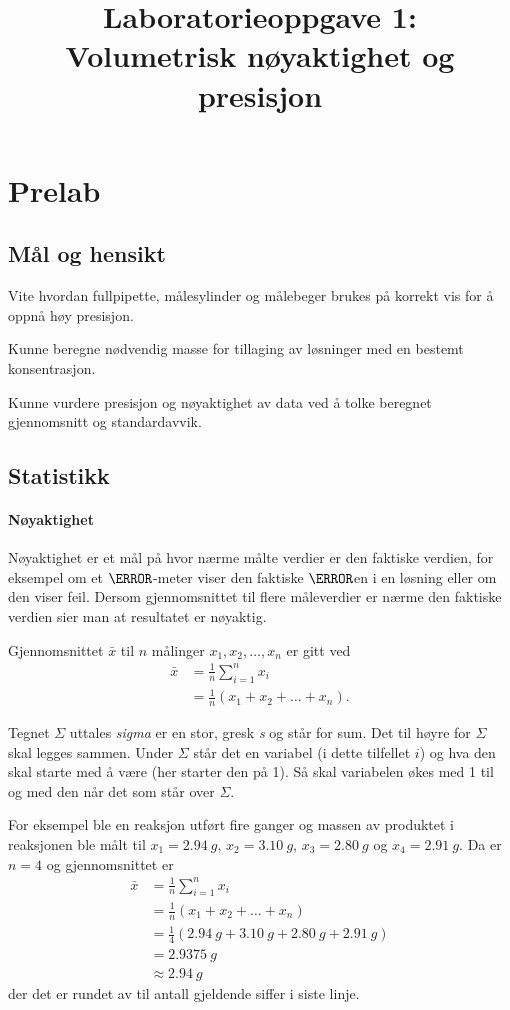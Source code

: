 \documentclass[hidelinks,12pt,norsk,a4paper,fleqn]{scrartcl}
\title{Laboratorieoppgave 1:\\
Volumetrisk nøyaktighet og presisjon}
\author{}
\date{}
\begin{document}
			
	\maketitle
	
	\section{Prelab}
	
	\subsection{Mål og hensikt}
	Vite hvordan fullpipette, målesylinder og målebeger brukes på korrekt vis for å oppnå høy presisjon.
	
	Kunne beregne nødvendig masse for tillaging av løsninger med en bestemt konsentrasjon.
	
	Kunne vurdere presisjon og nøyaktighet av data ved å tolke beregnet gjennomsnitt og standardavvik.
	
	\subsection{Statistikk}
	
	\paragraph{Nøyaktighet}
	Nøyaktighet er et mål på hvor nærme målte verdier er den faktiske verdien, for eksempel om et $\pH$-meter viser den faktiske $\pH$en i en løsning eller om den viser feil. Dersom gjennomsnittet til flere måleverdier er nærme den faktiske verdien sier man at resultatet er nøyaktig.
	
	Gjennomsnittet $\bar{x}$ til $n$ målinger $x_1, x_2, \ldots, x_n$ er gitt ved
	\begin{align*}
		\bar{x} &= \frac{1}{n}\sum_{i=1}^{n}x_i\\
		&=\frac{1}{n}\left(x_1 + x_2 + \dots + x_n\right).
	\end{align*}
	
	Tegnet $\Sigma$ uttales \emph{sigma} er en stor, gresk \emph{s} og står for sum. Det til høyre for $\Sigma$ skal legges sammen. Under $\Sigma$ står det en variabel (i dette tilfellet $i$) og hva den skal starte med å være (her starter den på 1). Så skal variabelen økes med 1 til og med den når det som står over $\Sigma$.
	
	For eksempel ble en reaksjon utført fire ganger og massen av produktet i reaksjonen ble målt til $x_1=\SI{2.94}{g}$, $x_2=\SI{3.10}{g}$, $x_3=\SI{2.80}{g}$ og $x_4=\SI{2.91}{g}$. Da er $n=4$ og gjennomsnittet er
	\begin{align*}
		\bar{x} &= \frac{1}{n}\sum_{i=1}^{n}x_i\\
		&=\frac{1}{n}\left(x_1 + x_2 + \dots + x_n\right)\\
		&=\frac{1}{4}\left(\SI{2.94}{g} + \SI{3.10}{g} + \SI{2.80}{g} + \SI{2.91}{g}\right)\\
		&=\SI{2.9375}{g}\\
		&\approx\SI{2.94}{g}
	\end{align*}
	der det er rundet av til antall gjeldende siffer i siste linje.
	
\end{document}
